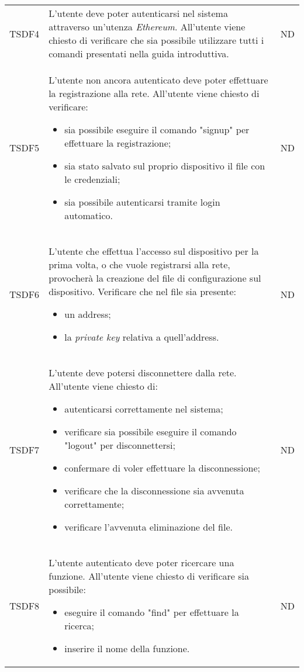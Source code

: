 \begin{longtable}{|C{2cm}|C{8cm}|C{2cm}|}
	TSDF4 &
	L’utente deve poter autenticarsi nel sistema attraverso un'utenza \textit{Ethereum}. All’utente viene chiesto di verificare che sia possibile utilizzare tutti i comandi presentati nella guida introduttiva. &
	ND \\
	
	TSDF5 &
	L’utente non ancora autenticato deve poter effettuare la registrazione alla rete. All’utente viene chiesto di verificare:
	\begin{itemize}
		\item sia possibile eseguire il comando "signup" per effettuare la registrazione;
		\item sia stato salvato sul proprio dispositivo il file con le credenziali;
		\item sia possibile autenticarsi tramite login automatico.
	\end{itemize} &
	ND \\
	
	TSDF6 &
	L'utente che effettua l'accesso sul dispositivo per la prima volta, o che vuole registrarsi alla rete, provocherà la creazione del file di configurazione sul dispositivo. Verificare che nel file sia presente:
	\begin{itemize}
		\item un address;
		\item la \textit{private key\glo} relativa a quell'address.
	\end{itemize} &
	ND \\
	
	TSDF7  &
	L’utente deve potersi disconnettere dalla rete. All’utente viene chiesto di:
	\begin{itemize}
		\item autenticarsi correttamente nel sistema;
		\item verificare sia possibile eseguire il comando "logout" per disconnettersi;
		\item confermare di voler eﬀettuare la disconnessione;
		\item verificare che la disconnessione sia avvenuta correttamente;
		\item verificare l'avvenuta eliminazione del file.
	\end{itemize} &
	ND \\
	
	TSDF8  &
	L’utente autenticato deve poter ricercare una funzione. All’utente viene chiesto di verificare sia possibile:
	\begin{itemize}
		\item eseguire il comando "find" per effettuare la ricerca;
		\item inserire il nome della funzione.
	\end{itemize} &
	ND \\
	

\end{longtable}
